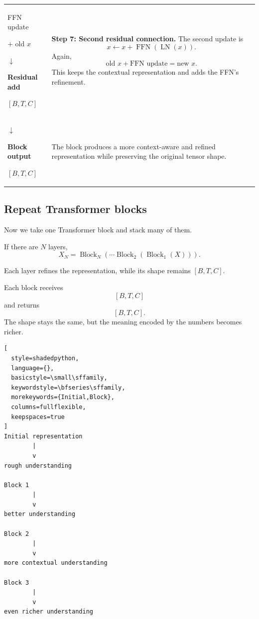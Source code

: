 \begin{longtable}{@{}p{}p{}@{}}
  {\centering\sffamily
    FFN update\par
    \(+\) old \(x\)\par
    \(\downarrow\)\par
    \textbf{Residual add}\par
    \([B,T,C]\)\par}
  &
  \textbf{Step 7: Second residual connection.}
  The second update is
  \[
    x\leftarrow x+
    \operatorname{FFN}\!\left(\operatorname{LN}(x)\right).
  \]
  Again,
  \[
    \text{old }x+\text{FFN update}=\text{new }x.
  \]
  This keeps the contextual representation and adds the FFN's refinement.
  \\

  {\centering\sffamily
    \(\downarrow\)\par
    \textbf{Block output}\par
    \([B,T,C]\)\par}
  &
  The block produces a more context-aware and refined representation while
  preserving the original tensor shape.
  \\
\end{longtable}
\endgroup



\subsection{Repeat Transformer blocks}

Now we take one Transformer block and stack many of them.

If there are \(N\) layers,
\[
  X_N=\operatorname{Block}_N\!\left(
    \cdots\operatorname{Block}_2\!\left(
      \operatorname{Block}_1(X)
    \right)
  \right).
\]

Each layer refines the representation, while its shape remains \([B,T,C]\).

Each block receives
\[
  [B,T,C]
\]
and returns
\[
  [B,T,C].
\]
The shape stays the same, but the meaning encoded by the numbers becomes
richer.



\begin{lstlisting}[
  style=shadedpython,
  language={},
  basicstyle=\small\sffamily,
  keywordstyle=\bfseries\sffamily,
  morekeywords={Initial,Block},
  columns=fullflexible,
  keepspaces=true
]
Initial representation
        |
        v
rough understanding

Block 1
        |
        v
better understanding

Block 2
        |
        v
more contextual understanding

Block 3
        |
        v
even richer understanding
\end{lstlisting}


